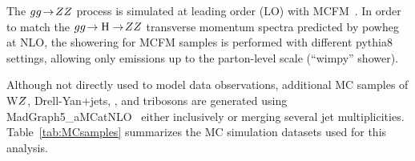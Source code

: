 The $gg \! \to \! ZZ$ process is simulated at leading order (LO) 
with MCFM~\cite{MCFM,Campbell:2013una}. In order to match the 
$gg \! \to \mathrm{H} \to \! ZZ$ transverse momentum spectra predicted 
by {\sc powheg} at NLO, the showering for MCFM samples is performed with 
different {\sc pythia8} settings, allowing only emissions up to the parton-level scale
(``wimpy'' shower).

Although not directly used to model data observations, additional 
MC samples of W$Z$, Drell-Yan+jets, \ttbar, and tribosons are
generated using {\sc MadGraph5\_aMCatNLO}~\cite{Alwall:2014hca} either
inclusively or merging several jet multiplicities.
Table~\ref{tab:MCsamples} summarizes the MC simulation datasets used for this analysis. 

\begin{table}
\begin{footnotesize}
    \centering
{}
\end{footnotesize}
\end{table}

